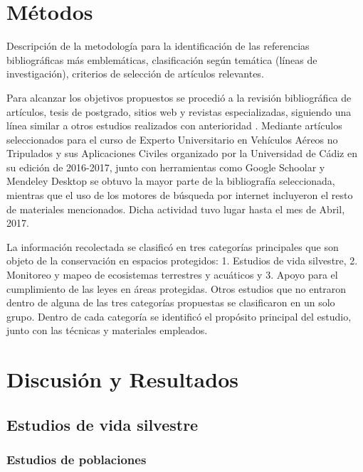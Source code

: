 \documentclass[11pt,]{article}
\begin{document}
\section{Métodos}\label{metodos}

Descripción de la metodología para la identificación de las referencias
bibliográficas más emblemáticas, clasificación según temática (líneas de
investigación), criterios de selección de artículos relevantes.

Para alcanzar los objetivos propuestos se procedió a la revisión
bibliográfica de artículos, tesis de postgrado, sitios web y revistas
especializadas, siguiendo una línea similar a otros estudios realizados
con anterioridad \citet{Linchant2015}. Mediante artículos seleccionados
para el curso de Experto Universitario en Vehículos Aéreos no Tripulados
y sus Aplicaciones Civiles organizado por la Universidad de Cádiz en su
edición de 2016-2017, junto con herramientas como Google Schoolar y
Mendeley Desktop se obtuvo la mayor parte de la bibliografía
seleccionada, mientras que el uso de los motores de búsqueda por
internet incluyeron el resto de materiales mencionados. Dicha actividad
tuvo lugar hasta el mes de Abril, 2017.

La información recolectada se clasificó en tres categorías principales
que son objeto de la conservación en espacios protegidos: 1. Estudios de
vida silvestre, 2. Monitoreo y mapeo de ecosistemas terrestres y
acuáticos y 3. Apoyo para el cumplimiento de las leyes en áreas
protegidas. Otros estudios que no entraron dentro de alguna de las tres
categorías propuestas se clasificaron en un solo grupo. Dentro de cada
categoría se identificó el propósito principal del estudio, junto con
las técnicas y materiales empleados.

\section{Discusión y Resultados}\label{discusion-y-resultados}

\subsection{Estudios de vida
silvestre}\label{estudios-de-vida-silvestre}

\subsubsection{Estudios de poblaciones}\label{estudios-de-poblaciones}
\end{document}
